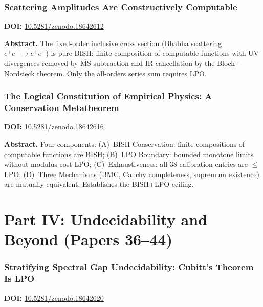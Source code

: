 \documentclass[11pt,a4paper]{article}
\begin{document}
\section{Scattering Amplitudes Are Constructively Computable}
\label{sec:p34}
\textbf{DOI:} \href{https://doi.org/10.5281/zenodo.18642612}{10.5281/zenodo.18642612}

\bigskip
\noindent\textbf{Abstract.}
The fixed-order inclusive cross section (Bhabha scattering $e^+e^-\to e^+e^-$) is pure BISH: finite composition of computable functions with UV divergences removed by $\overline{\mathrm{MS}}$ subtraction and IR cancellation by the Bloch--Nordsieck theorem. Only the all-orders series sum requires LPO.

\section{The Logical Constitution of Empirical Physics: A Conservation Metatheorem}
\label{sec:p35}
\textbf{DOI:} \href{https://doi.org/10.5281/zenodo.18642616}{10.5281/zenodo.18642616}

\bigskip
\noindent\textbf{Abstract.}
Four components: (A)~BISH Conservation: finite compositions of computable functions are BISH; (B)~LPO Boundary: bounded monotone limits without modulus cost LPO; (C)~Exhaustiveness: all 38 calibration entries are $\le$ LPO; (D)~Three Mechanisms (BMC, Cauchy completeness, supremum existence) are mutually equivalent. Establishes the BISH+LPO ceiling.


\newpage
\part*{Part IV: Undecidability and Beyond (Papers 36--44)}

\section{Stratifying Spectral Gap Undecidability: Cubitt's Theorem Is LPO}
\label{sec:p36}
\textbf{DOI:} \href{https://doi.org/10.5281/zenodo.18642620}{10.5281/zenodo.18642620}
\end{document}
